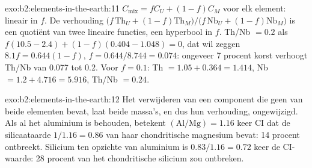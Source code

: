 \begin{solution}{exo:b2:elements-in-the-earth:11}
$C_{\mathrm{mix}} = fC_U + (1-f)C_M$ voor elk element: lineair in $f$. De verhouding
$\bigl(f\,\mathrm{Th}_U + (1-f)\mathrm{Th}_M\bigr)/\bigl(f\,\mathrm{Nb}_U +
(1-f)\mathrm{Nb}_M\bigr)$ is een quotiënt van twee lineaire functies, een hyperbool in $f$.
Th/Nb $= 0.2$ als $f(10.5-2.4) + (1-f)(0.404-1.048) = 0$, dat wil zeggen $8.1f = 0.644(1-f)$,
$f = 0.644/8.744 = 0.074$: ongeveer 7 procent korst verhoogt Th/Nb van 0.077 tot 0.2. Voor
$f = 0.1$: Th $= 1.05 + 0.364 = 1.414$, Nb $= 1.2 + 4.716 = 5.916$, Th/Nb $= 0.24$.
\end{solution}

\begin{solution}{exo:b2:elements-in-the-earth:12}
Het verwijderen van een component die geen van beide elementen bevat, laat beide massa's, en dus hun verhouding,
ongewijzigd. Als al het aluminium is behouden, betekent $(\mathrm{Al}/\mathrm{Mg}) = 1.16$ keer CI
dat de silicaataarde $1/1.16 = 0.86$ van haar chondritische magnesium bevat: 14
procent ontbreekt. Silicium ten opzichte van aluminium is $0.83/1.16 = 0.72$ keer de CI-waarde:
28 procent van het chondritische silicium zou ontbreken.
\end{solution}

